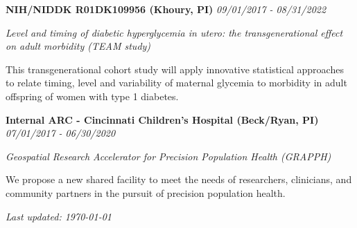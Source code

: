 \documentclass[margin,line]{res}
\newenvironment{list3}{
  \begin{list}{}{%
      \setlength{\itemsep}{0in}
      \setlength{\parsep}{0in} \setlength{\parskip}{0in}
      \setlength{\topsep}{0in} \setlength{\partopsep}{0in} 
      \setlength{\leftmargin}{0in}}}{\end{list}}
\begin{document}
\begin{resume}
\vspace*{.1in}

\begin{list3} \itemsep 4pt
    \item[] \textbf{NIH/NIDDK R01DK109956 (Khoury, PI)} \hfill \textit{09/01/2017 - 08/31/2022}
\item[] \textit{Level and timing of diabetic hyperglycemia in utero: the transgenerational effect on adult morbidity (TEAM study)}
\item[] This transgenerational cohort study will apply innovative statistical approaches to relate timing, level and variability of maternal glycemia to morbidity in adult offspring of women with type 1 diabetes.
\end{list3}

\vspace*{.1in}

\begin{list3} \itemsep 4pt
    \item[] \textbf{Internal ARC - Cincinnati Children's Hospital (Beck/Ryan, PI)} \hfill \textit{07/01/2017 - 06/30/2020}
\item[] \textit{Geospatial Research Accelerator for Precision Population Health (GRAPPH)}
\item[] We propose a new shared facility to meet the needs of researchers, clinicians, and community partners in the pursuit of precision population health.
\end{list3}

\end{resume}

\vfill

\hfill \textit{Last updated: \today}
\end{document}

